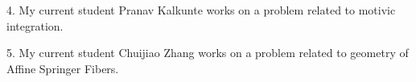 \documentclass[11pt]{amsart}
\theoremstyle{plain}
\theoremstyle{definition}
\theoremstyle{remark}
\begin{document}
4. My current student Pranav Kalkunte works on a problem related to motivic integration.

5. My current student Chuijiao Zhang works on a  problem related to geometry of Affine Springer Fibers.


\end{document}
